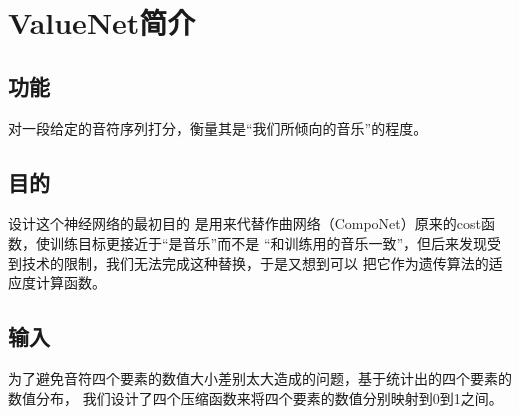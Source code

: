 \documentclass{article}
\begin{document}
\fi

  \section{ValueNet简介}  
  \subsection{功能}
    对一段给定的音符序列打分，衡量其是“我们所倾向的音乐”的程度。
  \subsection{目的}
    设计这个神经网络的最初目的
    是用来代替作曲网络（CompoNet）原来的cost函数，使训练目标更接近于“是音乐”而不是
    “和训练用的音乐一致”，但后来发现受到技术的限制，我们无法完成这种替换，于是又想到可以
    把它作为遗传算法的适应度计算函数。
  \subsection{输入}
    为了避免音符四个要素的数值大小差别太大造成的问题，基于统计出的四个要素的数值分布，
    我们设计了四个压缩函数来将四个要素的数值分别映射到0到1之间。
\end{document}
